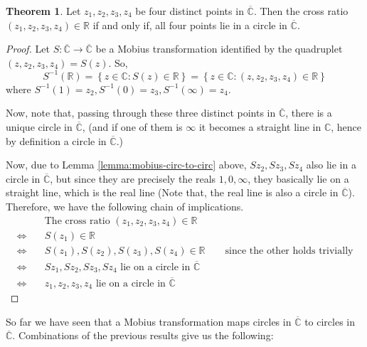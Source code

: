 \documentclass[12pt]{article}
\newcommand{\R}{\mathbb{R}}
\newcommand{\C}{\mathbb{C}}
\newcommand{\Cinf}{\overline{\C}}
\theoremstyle{definition}
\newtheorem{thm}{Theorem}
\newenvironment{theorem}{
\begin{tcolorbox}[colback=green!5!white,colframe=green!75!black, parbox = false]\begin{thm} }{\end{thm}\end{tcolorbox} }
\begin{document}
\begin{theorem}
    Let $z_1, z_2, z_3, z_4$ be four distinct points in $\Cinf$. Then the cross ratio $(z_1, z_2, z_3, z_4) \in \R$ if and only if, all four points lie in a circle in $\Cinf$.
\end{theorem}

\begin{proof}
    Let $S : \Cinf \rightarrow \Cinf$ be a Mobius transformation identified by the quadruplet $(z, z_2, z_3, z_4) = S(z)$. So,
    $$S^{-1}(\R) = \left\{ z\in\C : S(z) \in \R \right\} = \left\{ z\in\C : (z, z_2, z_3, z_4) \in \R \right\}$$
    where $S^{-1}(1) = z_2, S^{-1}(0) = z_3, S^{-1}(\infty) = z_4$. 
    
    Now, note that, passing through these three distinct points in $\Cinf$, there is a unique circle in $\Cinf$, (and if one of them is $\infty$ it becomes a straight line in $\C$, hence by definition a circle in $\Cinf$.)
    
    Now, due to Lemma \ref{lemma:mobius-circ-to-circ} above, $Sz_2, Sz_3, Sz_4$ also lie in a circle in $\Cinf$, but since they are precisely the reals $1, 0, \infty$, they basically lie on a straight line, which is the real line (Note that, the real line is also a circle in $\Cinf$).
    Therefore, we have the following chain of implications.
    \begin{align*}
        & \text{The cross ratio } (z_1, z_2, z_3, z_4) \in \R\\
        \iff \quad & S(z_1) \in \R\\
        \iff \quad & S(z_1), S(z_2), S(z_3), S(z_4) \in \R \qquad \text{since the other holds trivially}\\
        \iff \quad & Sz_1, Sz_2, Sz_3, Sz_4 \text{ lie on a circle in } \Cinf\\
        \iff \quad & z_1, z_2, z_3, z_4 \text{ lie on a circle in } \Cinf
    \end{align*}
\end{proof}
So far we have seen that a Mobius transformation maps circles in $\Cinf$ to circles in $\Cinf$. Combinations of the previous results give us the following:
\end{document}
